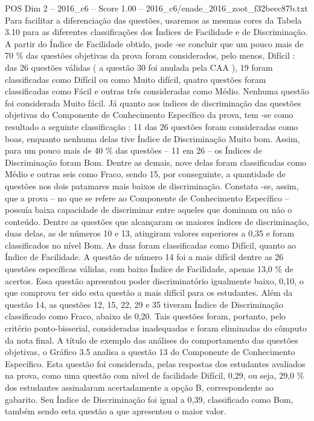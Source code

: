 \begin{textsample}{POS Dim 2 – 2016\_c6 – Score 1.00 – 2016\_c6/enade\_2016\_zoot\_f32beec87b.txt}
Para facilitar a diferenciação das questões, usaremos as mesmas cores da Tabela 3.10 para as diferentes classificações dos Índices de Facilidade e de Discriminação.
A partir do Índice de Facilidade obtido, pode -se concluir que um pouco mais de 70 \% das questões objetivas da prova foram considerados, pelo menos, Difícil : das 26 questões válidas ( a questão 30 foi anulada pela CAA ), 19 foram classificadas como Difícil ou como Muito difícil, quatro questões foram classificadas como Fácil e outras três consideradas como Médio.
Nenhuma questão foi considerada Muito fácil.
Já quanto aos índices de discriminação das questões objetivas do Componente de Conhecimento Específico da prova, tem -se como resultado a seguinte classificação : 11 das 26 questões foram consideradas como boas, enquanto nenhuma delas tive Índice de Discriminação Muito bom.
Assim, para um pouco mais de 40 \% das questões – 11 em 26 – os Índices de Discriminação foram Bom.
Dentre as demais, nove delas foram classificadas como Médio e outras seis como Fraco, sendo 15, por conseguinte, a quantidade de questões nos dois patamares mais baixos de discriminação.
Constata -se, assim, que a prova – no que se refere ao Componente de Conhecimento Específico – possuía baixa capacidade de discriminar entre aqueles que dominam ou não o conteúdo.
Dentre as questões que alcançaram os maiores índices de discriminação, duas delas, as de números 10 e 13, atingiram valores superiores a 0,35 e foram classificados no nível Bom.
As duas foram classificadas como Difícil, quanto ao Índice de Facilidade.
A questão de número 14 foi a mais difícil dentre as 26 questões específicas válidas, com baixo Índice de Facilidade, apenas 13,0 \% de acertos.
Essa questão apresentou poder discriminatório igualmente baixo, 0,10, o que comprova ter sido esta questão a mais difícil para os estudantes.
Além da questão 14, as questões 12, 15, 22, 29 e 35 tiveram Índice de Discriminação classificado como Fraco, abaixo de 0,20.
Tais questões foram, portanto, pelo critério ponto-bisserial, consideradas inadequadas e foram eliminadas do cômputo da nota final.
A título de exemplo das análises do comportamento das questões objetivas, o Gráfico 3.5 analisa a questão 13 do Componente de Conhecimento Específico.
Esta questão foi considerada, pelas respostas dos estudantes avaliados na prova, como uma questão com nível de facilidade Difícil, 0,29, ou seja, 29,0 \% dos estudantes assinalaram acertadamente a opção B, correspondente ao gabarito.
Seu Índice de Discriminação foi igual a 0,39, classificado como Bom, também sendo esta questão a que apresentou o maior valor.

\end{textsample}
